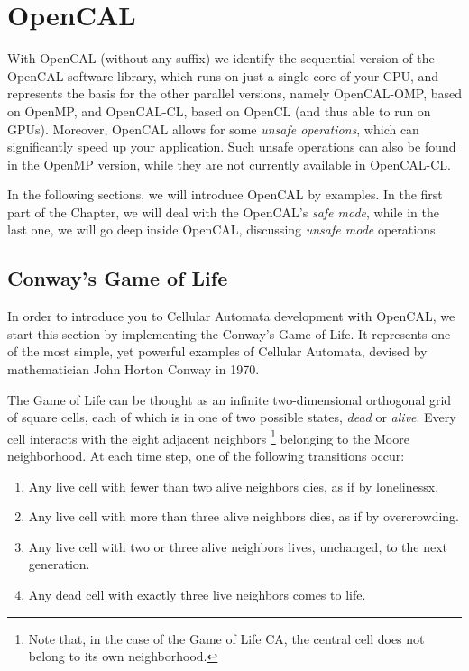\chapter{OpenCAL}\label{ch:opencal}

With OpenCAL (without any suffix) we identify the sequential version
of the OpenCAL software library, which runs on just a single core of
your CPU, and represents the basis for the other parallel versions,
namely OpenCAL-OMP, based on OpenMP, and OpenCAL-CL, based on OpenCL
(and thus able to run on GPUs). Moreover, OpenCAL allows for some
\emph{unsafe operations}, which can significantly speed up your
application. Such unsafe operations can also be found in the OpenMP
version, while they are not currently available in OpenCAL-CL.

In the following sections, we will introduce OpenCAL by examples. In
the first part of the Chapter, we will deal with the OpenCAL's
\emph{safe mode}, while in the last one, we will go deep inside
OpenCAL, discussing \emph{unsafe mode} operations.

\section{Conway's Game of Life}\label{sec:cal_life}

In order to introduce you to Cellular Automata development with
OpenCAL, we start this section by implementing the Conway's Game of
Life. It represents one of the most simple, yet powerful examples of
Cellular Automata, devised by mathematician John Horton Conway in
1970.

The Game of Life can be thought as an infinite two-dimensional
orthogonal grid of square cells, each of which is in one of two
possible states, \emph{dead} or \emph{alive}. Every cell interacts
with the eight adjacent neighbors \footnote{Note that, in the case of
  the Game of Life CA, the central cell does not belong to its own
  neighborhood.} belonging to the Moore neighborhood. At each time
step, one of the following transitions occur:

\begin{enumerate}
    \item Any live cell with fewer than two alive neighbors dies, as
      if by lonelinessx.
    \item Any live cell with more than three alive neighbors dies, as
      if by overcrowding.
    \item Any live cell with two or three alive neighbors lives,
      unchanged, to the next generation.
    \item Any dead cell with exactly three live neighbors comes to
      life.
\end{enumerate}

